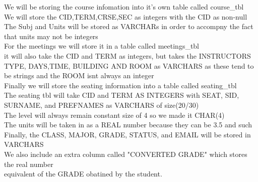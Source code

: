 We will be storing the course infomation into it's own table called course_tbl \\

We will store the CID,TERM,CRSE,SEC as integers with the CID as non-null\\

The Subj and Units will be stored as VARCHARs in order to accompny the fact that units may not be integers\\


For the meetings we will store it in a table called meetings_tbl \\

it will also take the CID and TERM as integers, but takes the INSTRUCTORS \\

TYPE, DAYS,TIME, BUILDING AND ROOM as VARCHARS as these tend to be strings and the ROOM isnt always an integer \\

Finally we will store the seating information into a table called seating_tbl \\

The seating tbl will take CID and TERM AS INTEGERS with SEAT, SID, SURNAME, and PREFNAMES as VARCHARS of size(20/30)\\

The level will always remain constant size of 4 so we made it CHAR(4) \\

The units will be taken in as a REAL number because they can be 3.5 and such \\

Finally, the CLASS, MAJOR, GRADE, STATUS, and EMAIL will be stored in VARCHARS\\

We also include an extra column called "CONVERTED GRADE" which stores the real number \\

equivalent of the GRADE obatined by the student.\\
